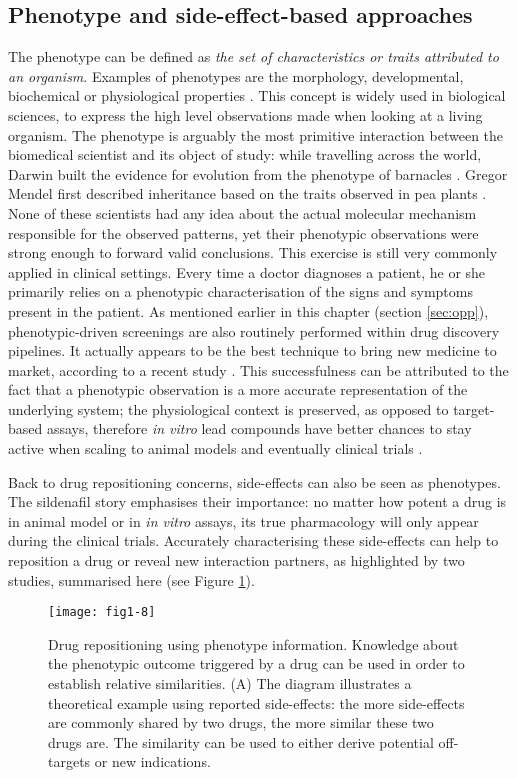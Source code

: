 \subsection{Phenotype and side-effect-based approaches}
The phenotype can be defined as \emph{the set of characteristics or traits attributed to an organism}. Examples of phenotypes are the morphology, developmental, biochemical or physiological properties \citep{phenotypewiki}. This concept is widely used in biological sciences, to express the high level observations made when looking at a living organism. The phenotype is arguably the most primitive interaction between the biomedical scientist and its object of study: while travelling across the world, Darwin built the evidence for evolution from the phenotype of barnacles \citep{darwin2009origin}. Gregor Mendel first described inheritance based on the traits observed in pea plants \citep{mendel1866versuche}. None of these scientists had any idea about the actual molecular mechanism responsible for the observed patterns, yet their phenotypic observations were strong enough to forward valid conclusions. This exercise is still very commonly applied in clinical settings. Every time a doctor diagnoses a patient, he or she primarily relies on a phenotypic characterisation of the signs and symptoms present in the patient. As mentioned earlier in this chapter (section \ref{sec:opp}), phenotypic-driven screenings are also routinely performed within drug discovery pipelines. It actually appears to be the best technique to bring new medicine to market, according to a recent study \citep{swinney2011were}. This successfulness can be attributed to the fact that a phenotypic observation is a more accurate representation of the underlying system; the physiological context is preserved, as opposed to target-based assays, therefore \emph{in vitro} lead compounds have better chances to stay active when scaling to animal models and eventually clinical trials \citep{duran2012recycling}.

Back to drug repositioning concerns, side-effects can also be seen as phenotypes. The sildenafil story emphasises their importance: no matter how potent a drug is in animal model or in \emph{in vitro} assays, its true pharmacology will only appear during the clinical trials. Accurately characterising these side-effects can help to reposition a drug or reveal new interaction partners, as highlighted by two studies, summarised here (see Figure \ref{fig1-8}).

\begin{figure}[ht]
    \centering
    \texttt{[image: fig1-8]}
    \caption{Drug repositioning using phenotype information. Knowledge about the phenotypic outcome triggered by a drug can be used in order to establish relative similarities. (A) The diagram illustrates a theoretical example using reported side-effects: the more side-effects are commonly shared by two drugs, the more similar these two drugs are. The similarity can be used to either derive potential off-targets or new indications.}
    \label{fig1-8}
\end{figure}

